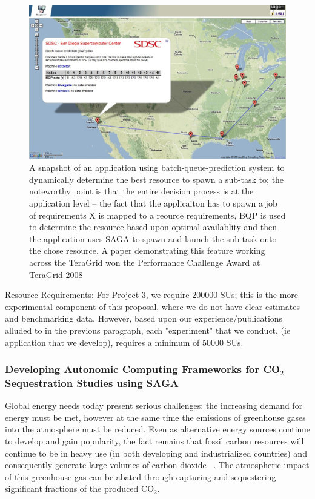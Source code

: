 \documentclass[a4paper,10pt]{article}
\begin{document}
\begin{figure}
\begin{center}
\includegraphics[scale=0.33]{gmaps_bqp.jpg}
\end{center}
\caption{A snapshot of an application using batch-queue-prediction system to dynamically determine the 
best resource to spawn a sub-task to; the noteworthy point is that the entire decision process is at the 
application level -- the fact that the applicaiton has to spawn a job of requirements X is mapped to a
reource requirements, BQP is used to determine the resource based upon optimal availablity and then the 
application uses SAGA to spawn and launch the sub-task onto the chose resource. A paper demonstrating
this feature working across the TeraGrid won the Performance Challenge Award at TeraGrid 2008}
\label{}
\end{figure}

Resource Requirements: For Project 3, we require 200000 SUs; this is the more experimental component
of this proposal, where we do not have clear estimates and benchmarking data. However, based upon our experience/publications alluded to in the previous paragraph, each 
"experiment" that we conduct, (ie application that we develop), requires a minimum of 50000 SUs.

\subsubsection*{Developing Autonomic Computing Frameworks for CO$_2$ Sequestration Studies using SAGA}
Global energy needs today present serious challenges: the increasing demand for energy 
must be met, however at the same time the 
emissions of greenhouse gases into the atmosphere must be reduced. Even as alternative 
energy sources continue to develop and gain 
popularity, the fact remains that fossil carbon resources will continue to be in heavy use 
(in both developing and industrialized 
countries) and consequently generate large volumes of carbon dioxide ~\cite{GeoRPT}. The 
atmospheric impact of this greenhouse gas 
can be abated through capturing and sequestering significant fractions of the produced 
CO$_2$.
\end{document}
